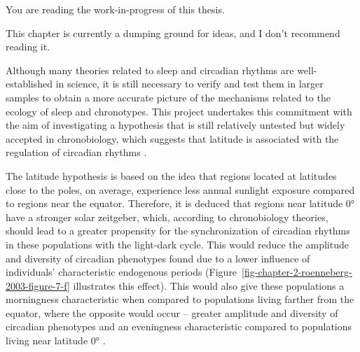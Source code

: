 \documentclass[
12pt,
openright,
oneside,
a4paper,
chapter=TITLE,
section=TITLE,
french,
spanish,
brazil,
english
]{abntex2}\usepackage{array}
\newcommand{\microskip}{\vspace{\microskipamount}}
\begin{document}
\begin{tcolorbox}[enhanced jigsaw, coltitle=black, opacitybacktitle=0.6, colframe=quarto-callout-important-color-frame, arc=.35mm, colbacktitle=quarto-callout-important-color!10!white, titlerule=0mm, title=\textcolor{quarto-callout-important-color}{\faExclamation}\hspace{0.5em}{Important}, breakable, bottomrule=.15mm, rightrule=.15mm, bottomtitle=1mm, left=2mm, opacityback=0, toprule=.15mm, leftrule=.75mm, toptitle=1mm, colback=white]

You are reading the work-in-progress of this thesis.

\microskip

This chapter is currently a dumping ground for ideas, and I don't
recommend reading it.

\end{tcolorbox}

Although many theories related to sleep and circadian rhythms are
well-established in science, it is still necessary to verify and test
them in larger samples to obtain a more accurate picture of the
mechanisms related to the ecology of sleep and chronotypes. This project
undertakes this commitment with the aim of investigating a hypothesis
that is still relatively untested but widely accepted in chronobiology,
which suggests that latitude is associated with the regulation of
circadian rhythms
\autocite{hut2013,leocadio-miguel2014,leocadio-miguel2017,pittendrigh1991,randler2008,randler2017,roenneberg2003}.

The latitude hypothesis is based on the idea that regions located at
latitudes close to the poles, on average, experience less annual
sunlight exposure compared to regions near the equator. Therefore, it is
deduced that regions near latitude 0° have a stronger solar zeitgeber,
which, according to chronobiology theories, should lead to a greater
propensity for the synchronization of circadian rhythms in these
populations with the light-dark cycle. This would reduce the amplitude
and diversity of circadian phenotypes found due to a lower influence of
individuals' characteristic endogenous periods
(Figure~\ref{fig-chapter-2-roenneberg-2003-figure-7-f} illustrates this
effect). This would also give these populations a morningness
characteristic when compared to populations living farther from the
equator, where the opposite would occur -- greater amplitude and
diversity of circadian phenotypes and an eveningness characteristic
compared to populations living near latitude 0°
\autocite{roenneberg2003}.
\end{document}
